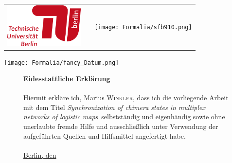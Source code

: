 \begin{titlepage}
\begin{center}
\begin{tabular}{ l r }
\end{tabular}
\end{center}


\vspace{1.0cm}


\begin{center}
\begin{tabular}{ l c r }
\includegraphics[width=4cm]{Formalia/tu-logo-2.png} & \hspace{7cm} & \texttt{[image: Formalia/sfb910.png]}
\end{tabular}
\end{center}

\vspace{0.5cm}

\begin{center}
\texttt{[image: Formalia/fancy\_Datum.png]}
\end{center}

\end{titlepage}


\newpage\leavevmode\thispagestyle{empty}\newpage


\thispagestyle{empty}


\begin{figure}[b]
    {\Large \textbf{Eidesstattliche Erklärung}}\\
    \vspace{0.1cm}\\
    Hiermit erkläre ich, \textcolor{vaukgreen}{Marius \scshape{Winkler}}, dass ich die vorliegende Arbeit mit dem Titel
    \textit{\glqq Synchronization of chimera states in multiplex networks of logistic maps\grqq}~selbstständig
    und eigenhändig sowie ohne unerlaubte fremde Hilfe und ausschließlich
    unter Verwendung der aufgeführten Quellen und Hilfsmittel angefertigt habe.\\
    \vspace{0.1cm}\\
    \uline{Berlin, den \hfill}
\end{figure}


\newpage\leavevmode\thispagestyle{empty}\newpage
\newpage\leavevmode\thispagestyle{empty}\newpage


\thispagestyle{empty}


